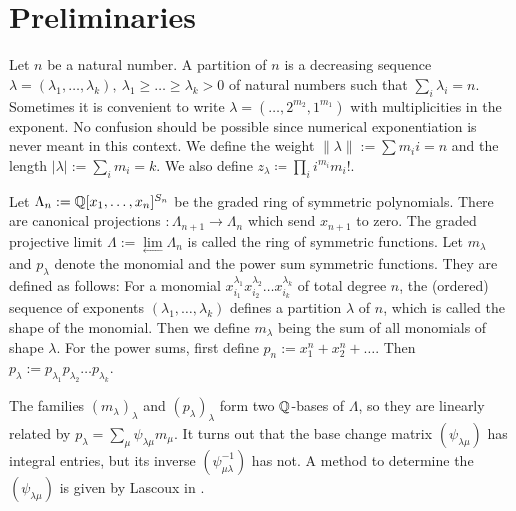 \section{Preliminaries}
\begin{definition}
Let $n$ be a natural number. A partition of $n$ is a decreasing sequence $\lambda = (\lambda_1,\ldots,\lambda_k),\ \lambda_1\geq\ldots\geq\lambda_k>0$ of natural numbers such that $\sum_i \lambda_i =n$. Sometimes it is convenient to write $\lambda = (\ldots,2^{m_2},1^{m_1})$ with multiplicities in the exponent. No confusion should be possible since numerical exponentiation is never meant in this context. We define the weight $\|\lambda\| :=\sum m_i i =n$ and the length $|\lambda| := \sum_i m_i =k$. We also define $z_\lambda \coloneqq\prod_i i^{m_i} m_i!$. 
\end{definition}
\begin{definition} \label{SymFun}
Let $\Lambda_n := \mathbb{Q}[x_1,\ldots,x_n]^{S_n}$ be the graded ring of symmetric polynomials. There are canonical projections $: \Lambda_{n+1}\rightarrow\Lambda_n$ which send $x_{n+1}$ to zero. The graded projective limit
$\Lambda:=\lim\limits_{\leftarrow}\Lambda_n$ is called the ring of symmetric functions.
Let $m_\lambda$ and $p_\lambda$ denote the monomial and the power sum symmetric functions. They are defined as follows: For a monomial $x_{i_1}^{\lambda_1}x_{i_2}^{\lambda_2}\ldots x_{i_k}^{\lambda_k}$ of total degree $n$, the (ordered) sequence of exponents $(\lambda_1,\ldots,\lambda_k)$ defines a partition $\lambda$ of $n$, which is called the shape of the monomial. Then we define $m_\lambda$ being the sum of all monomials of shape $\lambda$. For the power sums, first define $p_n := x_1^n + x_2^n + \ldots$. Then $p_\lambda := p_{\lambda_1}p_{\lambda_2}\ldots p_{\lambda_k}$.

The families $(m_\lambda)_\lambda$ and $(p_\lambda)_\lambda$ form two $\mathbb{Q}$-bases of $\Lambda$, so they are linearly related by $p_\lambda = \sum_{\mu} \psi_{\lambda\mu}m_\mu$. It turns out that the base change matrix $(\psi_{\lambda\mu})$ has integral entries, but its inverse $(\psi_{\mu\lambda}^{-1})$ has not. A method to determine the $(\psi_{\lambda\mu})$ is given by Lascoux in \cite[Sect. 3.7]{Lascoux}.
\end{definition}

